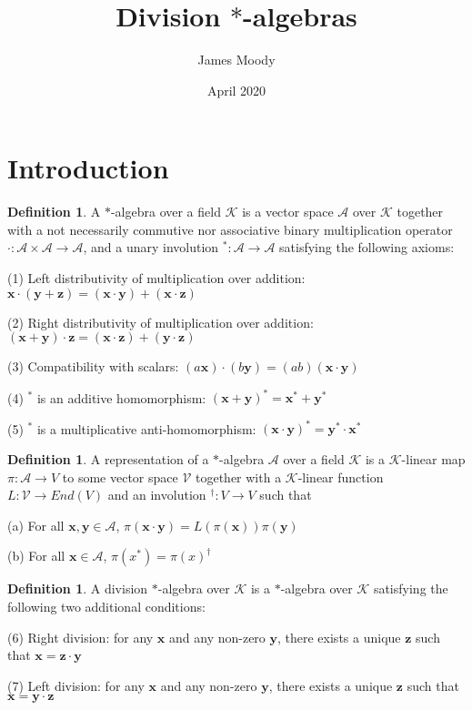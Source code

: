 \documentclass[12pt]{article}
\title{Division $*$-algebras}
\author{James Moody}
\date{April 2020}
\theoremstyle{definition}
\newtheorem{definition}[theorem]{Definition}
\theoremstyle{remark}
\begin{document}
\maketitle

\section*{Introduction} 

\begin{definition} A $*$-algebra over a field $\mathcal{K}$ is a vector space $\mathcal{A}$ over $\mathcal{K}$ together with a not necessarily commutive nor associative binary multiplication operator $\cdot: \mathcal{A} \times \mathcal{A} \rightarrow \mathcal{A}$, and a unary involution $^*:\mathcal{A} \rightarrow \mathcal{A}$ satisfying the following axioms:

(1) Left distributivity of multiplication over addition: $\mathbf{x} \cdot (\mathbf{y} + \mathbf{z}) = (\mathbf{x} \cdot \mathbf{y}) + (\mathbf{x} \cdot \mathbf{z})$

(2) Right distributivity of multiplication over addition: $(\mathbf{x}+\mathbf{y}) \cdot \mathbf{z} = (\mathbf{x} \cdot \mathbf{z}) + (\mathbf{y} \cdot \mathbf{z})$

(3) Compatibility with scalars: $(a\mathbf{x}) \cdot (b \mathbf{y}) = (ab)(\mathbf{x} \cdot \mathbf{y})$

(4) $^*$ is an additive homomorphism: $(\mathbf{x}+\mathbf{y})^* = \mathbf{x}^* + \mathbf{y}^*$

(5) $^*$ is a multiplicative anti-homomorphism: $(\mathbf{x} \cdot \mathbf{y})^* = \mathbf{y}^* \cdot \mathbf{x}^*$
\end{definition}

\begin{definition} A representation of a $*$-algebra $\mathcal{A}$ over a field $\mathcal{K}$ is a $\mathcal{K}$-linear map $\pi : \mathcal{A} \rightarrow V$ to some vector space $\mathcal{V}$ together with a $\mathcal{K}$-linear function $L: \mathcal{V} \rightarrow End(V)$ and an involution $^{\dagger} : V \rightarrow V$ such that

(a) For all $\mathbf{x}, \mathbf{y} \in \mathcal{A}$, $\pi(\mathbf{x} \cdot \mathbf{y}) = L(\pi(\mathbf{x})) \pi(\mathbf{y})$ 

(b) For all $\mathbf{x} \in \mathcal{A}$, $\pi(x^*) = \pi(x)^{\dagger}$
\end{definition} 

\begin{definition}
A division $*$-algebra over $\mathcal{K}$ is a $*$-algebra over $\mathcal{K}$ satisfying the following two additional conditions:

(6) Right division: for any $\mathbf{x}$ and any non-zero $\mathbf{y}$, there exists a unique $\mathbf{z}$ such that $\mathbf{x} = \mathbf{z} \cdot \mathbf{y}$

(7) Left division: for any $\mathbf{x}$ and any non-zero $\mathbf{y}$, there exists a unique $\mathbf{z}$ such that $\mathbf{x} = \mathbf{y} \cdot \mathbf{z}$
\end{definition}
\end{document}
